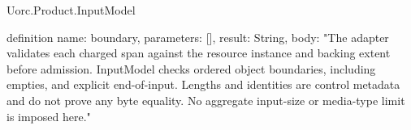 \begin{lexlean}{Uorc.Product.InputModel}
\begin{semanticmodule}
definition{
  name: boundary,
  parameters: [],
  result: String,
  body: "The adapter validates each charged span against the resource instance and backing extent before admission. InputModel checks ordered object boundaries, including empties, and explicit end-of-input. Lengths and identities are control metadata and do not prove any byte equality. No aggregate input-size or media-type limit is imposed here."
}
\end{semanticmodule}
\end{lexlean}

